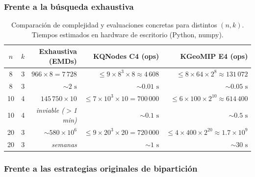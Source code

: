 \subsubsection*{Frente a la búsqueda exhaustiva}

\begin{table}[H]
  \centering
  \caption{Comparación de complejidad y evaluaciones concretas para distintos $(n, k)$.
           Tiempos estimados en hardware de escritorio (Python, numpy).}
  \label{tab:comparacion_exhaustiva}
  \begin{tabular}{ccrrr}
    \toprule
    $n$ & $k$ & \textbf{Exhaustiva} (EMDs) & \textbf{KQNodes C4} (ops) & \textbf{KGeoMIP E4} (ops) \\
    \midrule
    8  & 3 & $966 \times 8 = 7\,728$     & $\leq 9 \times 8^3 \times 8 \approx 4\,608$    & $\leq 8 \times 64 \times 2^8 \approx 131\,072$ \\
    8  & 3 & $\sim 2\text{ s}$            & $\sim 0.01\text{ s}$                            & $\sim 0.05\text{ s}$ \\[3pt]
    10 & 4 & $145\,750 \times 10$         & $\leq 7 \times 10^3 \times 10 = 700\,000$       & $\leq 6 \times 100 \times 2^{10} \approx 614\,400$ \\
    10 & 4 & \textit{inviable ($>$1 min)} & $\sim 0.1\text{ s}$                             & $\sim 0.5\text{ s}$ \\[3pt]
    20 & 3 & $\sim 580 \times 10^6$       & $\leq 9 \times 20^3 \times 20 = 720\,000$       & $\leq 4 \times 400 \times 2^{20} \approx 1.7 \times 10^9$ \\
    20 & 3 & \textit{semanas}             & $\sim 1\text{ s}$                               & $\sim 30\text{ s}$ \\
    \bottomrule
  \end{tabular}
\end{table}

\subsubsection*{Frente a las estrategias originales de bipartición}

